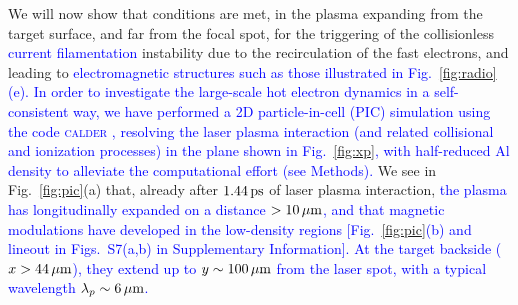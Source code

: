 \documentclass[aps,twocolumn,showpacs,superscriptaddress]{revtex4}
\begin{document}
We will now show that conditions are met, in the plasma  expanding from the target surface, and far from the focal spot, for the triggering of the collisionless \textcolor{blue}{current filamentation} instability due to the recirculation of the fast electrons, and leading to \textcolor{blue}{electromagnetic structures such as those illustrated in Fig.~\ref{fig:radio}(e). In order to investigate the large-scale hot electron dynamics in a self-consistent way, we have performed a 2D particle-in-cell (PIC) simulation using the code \textsc{calder} \cite{NF_Lefebvre_2003}, resolving the laser plasma interaction (and related collisional and ionization processes) in the plane shown in Fig.~\ref{fig:xp}, with half-reduced Al density to alleviate the computational effort (see Methods).}
We see in Fig.~\ref{fig:pic}(a) that, already after $1.44\,\rm ps$ of laser plasma interaction, \textcolor{blue}{the plasma has longitudinally expanded on a distance $>10\,\rm \mu m$, and that magnetic modulations have developed in the low-density regions [Fig.~\ref{fig:pic}(b) and lineout in Figs.~S7(a,b) in Supplementary Information]. At the target backside ($x>44\,\rm \mu m$), they extend up to $y \sim 100\,\rm \mu m$ from the laser spot, with a typical wavelength $\lambda_p \sim 6\,\rm \mu m$.}
\end{document}
